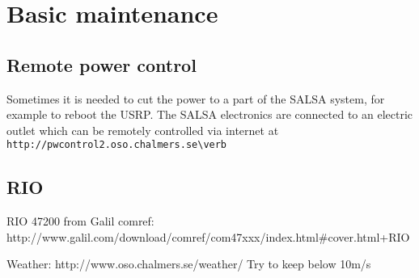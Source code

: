 \chapter{Basic maintenance}

\section{Remote power control}
Sometimes it is needed to cut the power to a part of the SALSA system,
for example to reboot the USRP. The SALSA electronics are connected to an electric outlet which
can be remotely controlled via internet at 
\verb! http://pwcontrol2.oso.chalmers.se\verb!

\section{RIO}
RIO 47200 from Galil
comref: http://www.galil.com/download/comref/com47xxx/index.html#cover.html+RIO

Weather:
http://www.oso.chalmers.se/weather/
Try to keep below 10m/s
